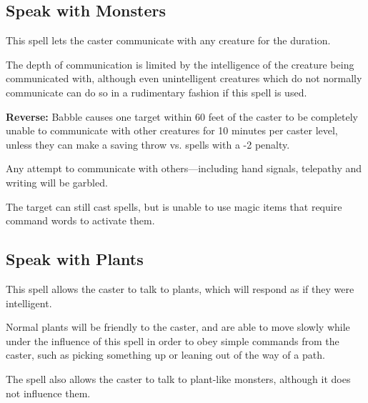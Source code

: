 \begin{multicols*}{2}
\subsection{Speak with Monsters}\label{spell:Speak with Monsters}

This spell lets the caster communicate with any creature for the duration.

The depth of communication is limited by the intelligence of the creature being communicated with, although even unintelligent creatures which do not normally communicate can do so in a rudimentary fashion if this spell is used.

\textbf{Reverse:} Babble causes one target within 60 feet of the caster to be completely unable to communicate with other creatures for 10 minutes per caster level, unless they can make a saving throw vs. spells with a -2 penalty.

Any attempt to communicate with others—including hand signals, telepathy and writing will be garbled.

The target can still cast spells, but is unable to use magic items that require command words to activate them.

\subsection{Speak with Plants}\label{spell:Speak with Plants}

This spell allows the caster to talk to plants, which will respond as if they were intelligent.

Normal plants will be friendly to the caster, and are able to move slowly while under the influence of this spell in order to obey simple commands from the caster, such as picking something up or leaning out of the way of a path.

The spell also allows the caster to talk to plant-like monsters, although it does not influence them.


\end{multicols*}
